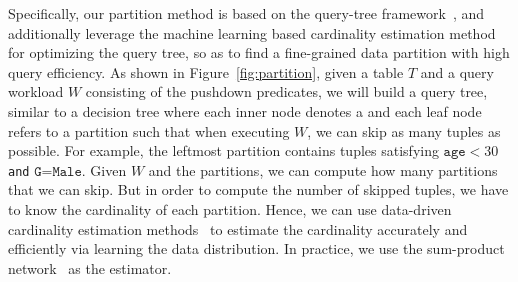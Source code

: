  Specifically, our partition method is based on the query-tree framework~\cite{}, and additionally leverage the machine learning based cardinality estimation method for optimizing the query tree, so as to find a fine-grained data partition with high query efficiency. 
As shown in Figure~\ref{fig:partition}, given a table $T$ and a query workload $W$ consisting of the pushdown predicates, we will build a query tree, similar to a decision tree where each inner node denotes a  and each leaf node refers to a partition such that when executing $W$, we can skip as many tuples as possible. For example, the leftmost partition contains tuples satisfying $\texttt{age}<30$ \texttt{and} $\texttt{G=Male}$. Given $W$ and the partitions, we can compute how many partitions that we can skip. But in order to compute the number of skipped tuples, we have to know the cardinality of each partition. Hence, we can use data-driven cardinality estimation methods~\cite{} to estimate the cardinality accurately and efficiently via learning the data distribution. In practice, we use the sum-product network~\cite{} as the estimator. 




